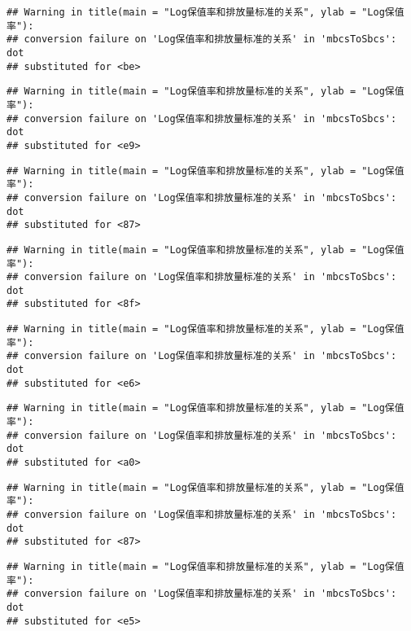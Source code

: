 \documentclass[]{article}
\begin{document}
\begin{verbatim}
## Warning in title(main = "Log保值率和排放量标准的关系", ylab = "Log保值率"):
## conversion failure on 'Log保值率和排放量标准的关系' in 'mbcsToSbcs': dot
## substituted for <be>
\end{verbatim}

\begin{verbatim}
## Warning in title(main = "Log保值率和排放量标准的关系", ylab = "Log保值率"):
## conversion failure on 'Log保值率和排放量标准的关系' in 'mbcsToSbcs': dot
## substituted for <e9>
\end{verbatim}

\begin{verbatim}
## Warning in title(main = "Log保值率和排放量标准的关系", ylab = "Log保值率"):
## conversion failure on 'Log保值率和排放量标准的关系' in 'mbcsToSbcs': dot
## substituted for <87>
\end{verbatim}

\begin{verbatim}
## Warning in title(main = "Log保值率和排放量标准的关系", ylab = "Log保值率"):
## conversion failure on 'Log保值率和排放量标准的关系' in 'mbcsToSbcs': dot
## substituted for <8f>
\end{verbatim}

\begin{verbatim}
## Warning in title(main = "Log保值率和排放量标准的关系", ylab = "Log保值率"):
## conversion failure on 'Log保值率和排放量标准的关系' in 'mbcsToSbcs': dot
## substituted for <e6>
\end{verbatim}

\begin{verbatim}
## Warning in title(main = "Log保值率和排放量标准的关系", ylab = "Log保值率"):
## conversion failure on 'Log保值率和排放量标准的关系' in 'mbcsToSbcs': dot
## substituted for <a0>
\end{verbatim}

\begin{verbatim}
## Warning in title(main = "Log保值率和排放量标准的关系", ylab = "Log保值率"):
## conversion failure on 'Log保值率和排放量标准的关系' in 'mbcsToSbcs': dot
## substituted for <87>
\end{verbatim}

\begin{verbatim}
## Warning in title(main = "Log保值率和排放量标准的关系", ylab = "Log保值率"):
## conversion failure on 'Log保值率和排放量标准的关系' in 'mbcsToSbcs': dot
## substituted for <e5>
\end{verbatim}
\end{document}
